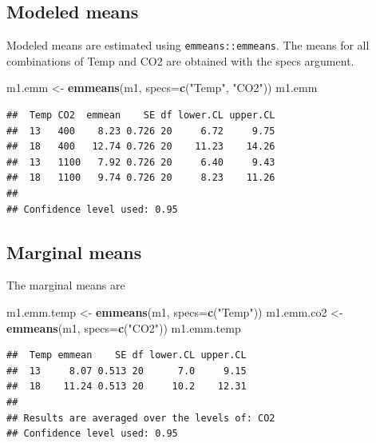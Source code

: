 \documentclass[]{book}
\newenvironment{Shaded}{\begin{snugshade}}{\end{snugshade}}
\newcommand{\DataTypeTok}[1]{\textcolor[rgb]{0.13,0.29,0.53}{#1}}
\newcommand{\KeywordTok}[1]{\textcolor[rgb]{0.13,0.29,0.53}{\textbf{#1}}}
\newcommand{\NormalTok}[1]{#1}
\newcommand{\StringTok}[1]{\textcolor[rgb]{0.31,0.60,0.02}{#1}}
\begin{document}
\hypertarget{modeled-means}{%
\subsection{Modeled means}\label{modeled-means}}

Modeled means are estimated using \texttt{emmeans::emmeans}. The means for all combinations of Temp and CO2 are obtained with the specs argument.

\begin{Shaded}
\begin{Highlighting}[]
\NormalTok{m1.emm <-}\StringTok{ }\KeywordTok{emmeans}\NormalTok{(m1, }\DataTypeTok{specs=}\KeywordTok{c}\NormalTok{(}\StringTok{"Temp"}\NormalTok{, }\StringTok{"CO2"}\NormalTok{))}
\NormalTok{m1.emm}
\end{Highlighting}
\end{Shaded}

\begin{verbatim}
##  Temp CO2  emmean    SE df lower.CL upper.CL
##  13   400    8.23 0.726 20     6.72     9.75
##  18   400   12.74 0.726 20    11.23    14.26
##  13   1100   7.92 0.726 20     6.40     9.43
##  18   1100   9.74 0.726 20     8.23    11.26
## 
## Confidence level used: 0.95
\end{verbatim}

\hypertarget{marginal-means}{%
\subsection{Marginal means}\label{marginal-means}}

The marginal means are

\begin{Shaded}
\begin{Highlighting}[]
\NormalTok{m1.emm.temp <-}\StringTok{ }\KeywordTok{emmeans}\NormalTok{(m1, }\DataTypeTok{specs=}\KeywordTok{c}\NormalTok{(}\StringTok{"Temp"}\NormalTok{))}
\NormalTok{m1.emm.co2 <-}\StringTok{ }\KeywordTok{emmeans}\NormalTok{(m1, }\DataTypeTok{specs=}\KeywordTok{c}\NormalTok{(}\StringTok{"CO2"}\NormalTok{))}
\NormalTok{m1.emm.temp}
\end{Highlighting}
\end{Shaded}

\begin{verbatim}
##  Temp emmean    SE df lower.CL upper.CL
##  13     8.07 0.513 20      7.0     9.15
##  18    11.24 0.513 20     10.2    12.31
## 
## Results are averaged over the levels of: CO2 
## Confidence level used: 0.95
\end{verbatim}
\end{document}
